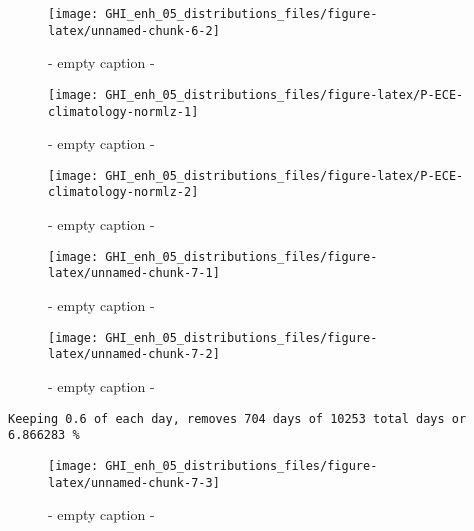 \documentclass[
  10pt,
  a4paper,oneside]{article}
\begin{document}
\begin{figure}[H]

{\centering \texttt{[image: GHI\_enh\_05\_distributions\_files/figure-latex/unnamed-chunk-6-2]} 

}

\caption{ - empty caption - }\label{fig:unnamed-chunk-6-2}
\end{figure}
\begin{figure}[H]

{\centering \texttt{[image: GHI\_enh\_05\_distributions\_files/figure-latex/P-ECE-climatology-normlz-1]} 

}

\caption{ - empty caption - }\label{fig:P-ECE-climatology-normlz-1}
\end{figure}
\begin{figure}[H]

{\centering \texttt{[image: GHI\_enh\_05\_distributions\_files/figure-latex/P-ECE-climatology-normlz-2]} 

}

\caption{ - empty caption - }\label{fig:P-ECE-climatology-normlz-2}
\end{figure}
\begin{figure}[H]

{\centering \texttt{[image: GHI\_enh\_05\_distributions\_files/figure-latex/unnamed-chunk-7-1]} 

}

\caption{ - empty caption - }\label{fig:unnamed-chunk-7-1}
\end{figure}
\begin{figure}[H]

{\centering \texttt{[image: GHI\_enh\_05\_distributions\_files/figure-latex/unnamed-chunk-7-2]} 

}

\caption{ - empty caption - }\label{fig:unnamed-chunk-7-2}
\end{figure}

\begin{verbatim}
Keeping 0.6 of each day, removes 704 days of 10253 total days or 6.866283 %
\end{verbatim}

\begin{figure}[H]

{\centering \texttt{[image: GHI\_enh\_05\_distributions\_files/figure-latex/unnamed-chunk-7-3]} 

}

\caption{ - empty caption - }\label{fig:unnamed-chunk-7-3}
\end{figure}
\end{document}
